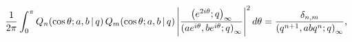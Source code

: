 \[\frac{1}{2\pi}\int_{0}^{\pi}\mathop{Q_{n}\/}\nolimits\!\left(\mathop{\cos\/}%
\nolimits\theta;a,b\,|\,q\right)\mathop{Q_{m}\/}\nolimits\!\left(\mathop{\cos%
\/}\nolimits\theta;a,b\,|\,q\right)\*\left|\frac{\left(e^{2i\theta};q\right)_{%
\infty}}{\left(ae^{i\theta},be^{i\theta};q\right)_{\infty}}\right|^{2}d\theta=%
\frac{\delta_{n,m}}{\left(q^{n+1},abq^{n};q\right)_{\infty}},\]